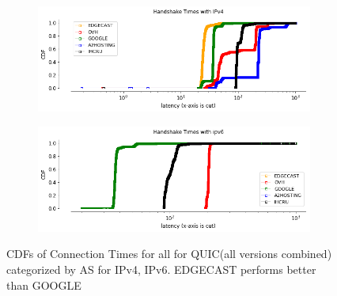 \begin{frame}
\begin{figure}[!htb]
    
    \begin{subfigure}{0.5\textwidth}
        \includegraphics[width=\linewidth]{./plots/VM/handshake_times_IPv4_asno.png}
    \end{subfigure}
    \begin{subfigure}{0.5\textwidth}
        \includegraphics[width=\linewidth]{./plots/VM/handshake_times_ipv6_asno.png}
    \end{subfigure} 
    \caption{CDFs of Connection Times for all for QUIC(all versions combined) categorized by AS for IPv4, IPv6. EDGECAST performs better than GOOGLE}\label{fig:connection-times-for}
\end{figure}

\end{frame}
\clearpage
